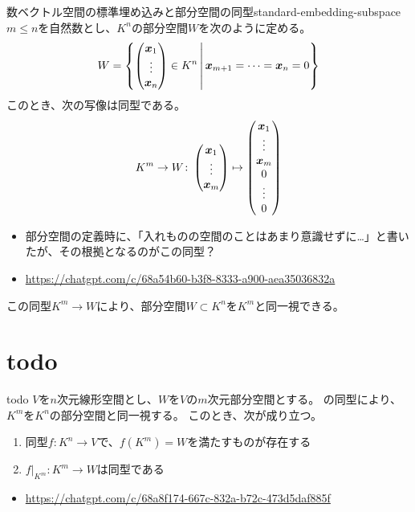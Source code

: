 \documentclass[../../../topic_linear-algebra]{subfiles}
\begin{document}
\begin{theorem}{数ベクトル空間の標準埋め込みと部分空間の同型}{standard-embedding-subspace}
  $m \leq n$を自然数とし、$K^n$の部分空間$W$を次のように定める。
  \begin{equation*}
    W = \left\{ \begin{pmatrix}
      \vb*{x}_1 \\ \vdots \\ \vb*{x}_n
    \end{pmatrix} \in K^n \,\middle|\,
    \begin{gathered} 
      \vb*{x}_{m+1} = \cdots = \vb*{x}_n = 0
    \end{gathered}
    \right\}
  \end{equation*}
  このとき、次の写像は同型である。
  \begin{equation*}
    K^m \to W \colon \begin{pmatrix}
      \vb*{x}_1 \\ \vdots \\ \vb*{x}_m
    \end{pmatrix} \mapsto \begin{pmatrix}
      \vb*{x}_1 \\ \vdots \\ \vb*{x}_m \\ 0 \\ \vdots \\ 0
    \end{pmatrix}
  \end{equation*}
\end{theorem}

\begin{mindflow}
  \begin{itemize}
    \item 部分空間の定義時に、「入れものの空間のことはあまり意識せずに…」と書いたが、その根拠となるのがこの同型？
    \item \url{https://chatgpt.com/c/68a54b60-b3f8-8333-a900-aea35036832a}
  \end{itemize}
\end{mindflow}

この同型$K^m \to W$により、部分空間$W \subset K^n$を$K^m$と同一視できる。

\sectionline
\section{todo}

\begin{theorem*}{todo}
  $V$を$n$次元線形空間とし、$W$を$V$の$m$次元部分空間とする。
  の同型により、$K^m$を$K^n$の部分空間と同一視する。
  このとき、次が成り立つ。
  \begin{enumerate}[label=\romanlabel]
    \item 同型$f\colon K^n \to V$で、$f(K^m) = W$を満たすものが存在する
    \item {}$f|_{K^m}\colon K^m \to W$は同型である
  \end{enumerate}
\end{theorem*}

\begin{mindflow}
  \begin{itemize}
    \item \url{https://chatgpt.com/c/68a8f174-667c-832a-b72c-473d5daf885f}
  \end{itemize}
\end{mindflow}
\end{document}
